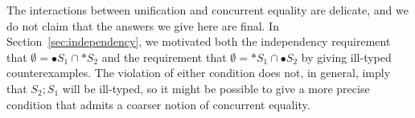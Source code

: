 The interactions between unification and concurrent equality are
delicate, and we do not claim that the answers we give here are
final. In Section~\ref{sec:independency}, we motivated both the
independency requirement that $\emptyset = {\bullet}S_1 \cap
{\ast}S_2$ and the requirement that $\emptyset = {\ast}S_1 \cap
{\bullet}S_2$ by giving ill-typed counterexamples. The violation of
either condition does not, in general, imply that $S_2; S_1$ will be
ill-typed, so it might be possible to give a more precise
condition that admits a coarser notion of concurrent equality.









